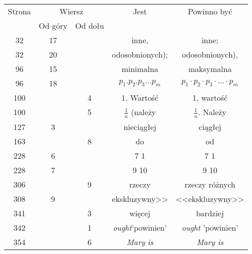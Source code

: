 \documentclass[a4paper,11pt]{article}
\begin{document}
\begin{center}

  \begin{tabular}{|c|c|c|c|c|}
    \hline
    Strona & \multicolumn{2}{c|}{Wiersz} & Jest
                              & Powinno być \\ \cline{2-3}
    & Od góry & Od dołu & & \\
    \hline
    32  & 17 & & inne, & inne; \\
    32  & 20 & & odosobnionych); & odosobnionych), \\
    96  & 15 & & minimalna & maksymalna \\
    96  & 18 & & $p_{ 1 } . p_{ 2 } . p_{ 3 } \ldots p_{ m }$
           & $p_{ 1 } \cdot p_{ 2 } \cdot p_{ 3 } \cdot \ldots \cdot p_{ m }$ \\
    100 & &  4 & 1. Wartość & 1, wartość \\
    100 & &  5 & $\frac{ 1 }{ n }$ (należy & $\frac{ 1 }{ n }$. Należy \\
    127 &  3 & & nieciągłej & ciągłej \\
    163 & &  8 & do & od \\
    228 &  6 & & 7{ }{ }{ } 1 & 7{ }{ } 1 \\
    228 &  7 & & 9{ }{ } 10 & 9 10 \\
    306 & &  9 & rzeczy & rzeczy różnych \\
    308 &  9 & & ekskluzywny>> & <<ekskluzywny>> \\
    341 & &  3 & więcej & bardziej \\
    342 & &  1 & \textit{ought}’powinien’ & \textit{ought} ’powinien’ \\
    354 & &  6 & \textit{Mary} { }{ } \textit{is} & \textit{Mary is} \\
    \hline
  \end{tabular}

\end{center}

\vspace{\spaceTwo}












\newpage
\end{document}
